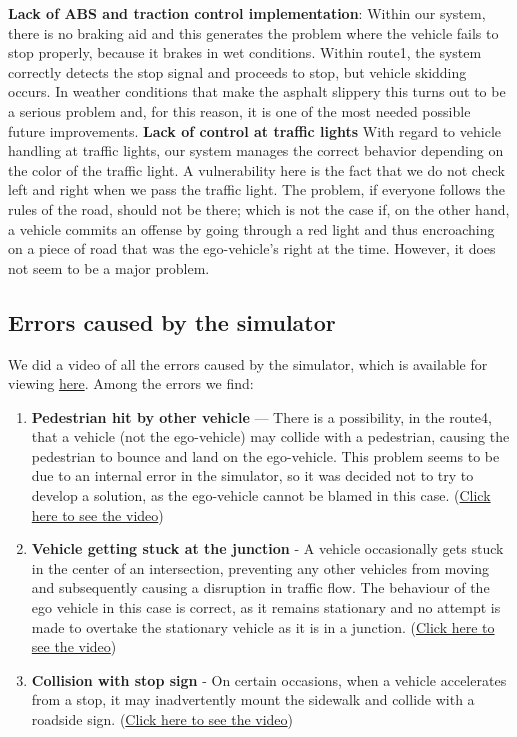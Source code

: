 \documentclass{article}
\begin{document}
\textbf{Lack of ABS and traction control implementation}\label{ABS}: Within our system, there is no braking aid and this generates the 
problem where the vehicle fails to stop properly, because it brakes in wet conditions. 
Within route1, the system correctly detects the stop signal and proceeds to stop, but vehicle skidding occurs.
In weather conditions that make the asphalt slippery this turns out to be a serious problem and, for this reason, it is one 
of the most needed possible future improvements.
\textbf{Lack of control at traffic lights}
With regard to vehicle handling at traffic lights, our system manages the correct behavior depending on the color of the 
traffic light. A vulnerability here is the fact that we do not check left and right when we pass the traffic light. The problem, 
if everyone follows the rules of the road, should not be there; which is not the case if, on the other hand, a vehicle commits 
an offense by going through a red light and thus encroaching on a piece of road that was the ego-vehicle's right at the time.
However, it does not seem to be a major problem.

\subsection{Errors caused by the simulator}\label{simErr}
We did a video of all the errors caused by the simulator, which is available for viewing \href{https://youtu.be/0O9b3UihDAw}{here}.
Among the errors we find:
\begin{enumerate}
    \item \textbf{Pedestrian hit by other vehicle} — There is a possibility, in the route4, that a vehicle (not the ego-vehicle) 
    may collide with a pedestrian, causing the pedestrian to bounce and land on the ego-vehicle. This problem seems to be due to 
    an internal error in the simulator, so it was decided not to try to develop a solution, as the ego-vehicle cannot be blamed 
    in this case. (\href{https://youtu.be/0O9b3UihDAw?t=11}{Click here to see the video})
    \item \textbf{Vehicle getting stuck at the junction} - A vehicle occasionally gets stuck in the center of an intersection, 
    preventing any other vehicles from moving and subsequently causing a disruption in traffic flow.
    The behaviour of the ego vehicle in this case is correct, as it remains stationary and no attempt is made to overtake the 
    stationary vehicle as it is in a junction. (\href{https://youtu.be/0O9b3UihDAw?t=19}{Click here to see the video})
    \item \textbf{Collision with stop sign} - On certain occasions, when a vehicle accelerates from a stop, it may inadvertently 
    mount the sidewalk and collide with a roadside sign. (\href{https://youtu.be/0O9b3UihDAw?t=40}{Click here to see the video})
\end{enumerate}
\end{document}
